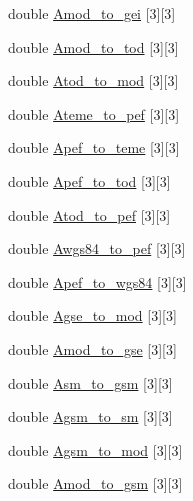 \begin{CompactItemize}
\item 
double \hyperlink{struct_lgm___c_trans_79800e94dbb4535121f274facd8b6934}{Amod\_\-to\_\-gei} \mbox{[}3\mbox{]}\mbox{[}3\mbox{]}
\item 
double \hyperlink{struct_lgm___c_trans_0e3054fe310e108d1ba7eb105157bfe4}{Amod\_\-to\_\-tod} \mbox{[}3\mbox{]}\mbox{[}3\mbox{]}
\item 
double \hyperlink{struct_lgm___c_trans_cc69117b82eb049717039242959205ec}{Atod\_\-to\_\-mod} \mbox{[}3\mbox{]}\mbox{[}3\mbox{]}
\item 
double \hyperlink{struct_lgm___c_trans_8d8bb9c7bf109ce43279c3cc26cf0c1c}{Ateme\_\-to\_\-pef} \mbox{[}3\mbox{]}\mbox{[}3\mbox{]}
\item 
double \hyperlink{struct_lgm___c_trans_9949aa9d5838e2e3a6b46c94d772dd59}{Apef\_\-to\_\-teme} \mbox{[}3\mbox{]}\mbox{[}3\mbox{]}
\item 
double \hyperlink{struct_lgm___c_trans_82510707db95aee065a6a529b22f4792}{Apef\_\-to\_\-tod} \mbox{[}3\mbox{]}\mbox{[}3\mbox{]}
\item 
double \hyperlink{struct_lgm___c_trans_1104a01831f9fe60ee88ddc9d7b5c15d}{Atod\_\-to\_\-pef} \mbox{[}3\mbox{]}\mbox{[}3\mbox{]}
\item 
double \hyperlink{struct_lgm___c_trans_5e570327e8c4ba164727c5831cdda367}{Awgs84\_\-to\_\-pef} \mbox{[}3\mbox{]}\mbox{[}3\mbox{]}
\item 
double \hyperlink{struct_lgm___c_trans_de0af2bce4c3134f0b09cc1a13b74733}{Apef\_\-to\_\-wgs84} \mbox{[}3\mbox{]}\mbox{[}3\mbox{]}
\item 
double \hyperlink{struct_lgm___c_trans_88dce682aa4e24179457f6616bb847c8}{Agse\_\-to\_\-mod} \mbox{[}3\mbox{]}\mbox{[}3\mbox{]}
\item 
double \hyperlink{struct_lgm___c_trans_346796db2e332c3bb5a1a565ade74e2e}{Amod\_\-to\_\-gse} \mbox{[}3\mbox{]}\mbox{[}3\mbox{]}
\item 
double \hyperlink{struct_lgm___c_trans_d060a87c222bb9f364f1196fc89ac03c}{Asm\_\-to\_\-gsm} \mbox{[}3\mbox{]}\mbox{[}3\mbox{]}
\item 
double \hyperlink{struct_lgm___c_trans_63d0ecd0a47f3ec17a7858304cd1cf99}{Agsm\_\-to\_\-sm} \mbox{[}3\mbox{]}\mbox{[}3\mbox{]}
\item 
double \hyperlink{struct_lgm___c_trans_35b300d0ecae5fa95f9a161a04a76c68}{Agsm\_\-to\_\-mod} \mbox{[}3\mbox{]}\mbox{[}3\mbox{]}
\item 
double \hyperlink{struct_lgm___c_trans_44ebaf4525593898cbabcea6c05cad3e}{Amod\_\-to\_\-gsm} \mbox{[}3\mbox{]}\mbox{[}3\mbox{]}

\end{CompactItemize}
